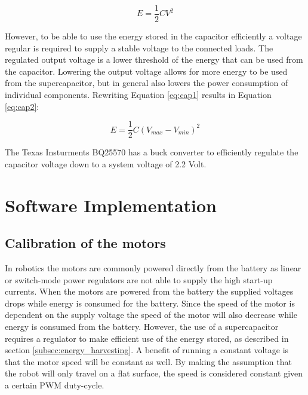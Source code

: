\begin{equation}
\label{eq:cap1}
E = \frac{1}{2}CV^{2}
\end{equation}

However, to be able to use the energy stored in the capacitor efficiently a voltage regular is required to supply a stable voltage to the connected loads.
The regulated output voltage is a lower threshold of the energy that can be used from the capacitor.
Lowering the output voltage allows for more energy to be used from the supercapacitor, but in general also lowers the power consumption of individual components. Rewriting Equation \ref{eq:cap1} results in Equation \ref{eq:cap2}:

\begin{equation}
\label{eq:cap2}
E = \frac{1}{2}C(V_{max} - V_{min})^{2}
\end{equation}

The Texas Insturments BQ25570 has a buck converter to efficiently regulate the capacitor voltage down to a system voltage of 2.2 Volt.


\section{Software Implementation}




\subsection{Calibration of the motors}
\label{subsub:motor_calib}

In robotics the motors are commonly powered directly from the battery as linear or switch-mode power regulators are not able to supply the high start-up currents.
When the motors are powered from the battery the supplied voltages drops while energy is consumed for the battery.
Since the speed of the motor is dependent on the supply voltage the speed of the motor will also decrease while energy is consumed from the battery.
However, the use of a supercapacitor requires a regulator to make efficient use of the energy stored, as described in section \ref{subsec:energy_harvesting}.
A benefit of running a constant voltage is that the motor speed will be constant as well.
By making the assumption that the robot will only travel on a flat surface, the speed is considered constant given a certain PWM duty-cycle.

